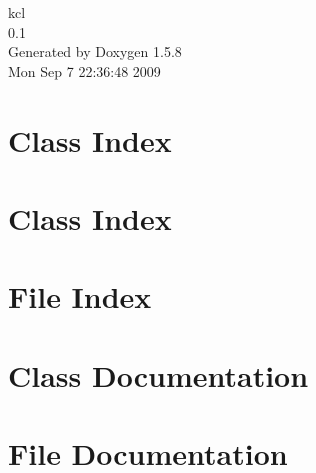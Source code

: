 \documentclass[a4paper]{book}
\begin{document}
\begin{titlepage}
\vspace*{7cm}
\begin{center}
{\Large kcl \\[1ex]\large 0.1 }\\
\vspace*{1cm}
{\large Generated by Doxygen 1.5.8}\\
\vspace*{0.5cm}
{\small Mon Sep 7 22:36:48 2009}\\
\end{center}
\end{titlepage}
\clearemptydoublepage
{}
\tableofcontents
\clearemptydoublepage
{}
\chapter{Class Index}

\chapter{Class Index}

\chapter{File Index}

\chapter{Class Documentation}


















\chapter{File Documentation}




























\printindex
\end{document}
